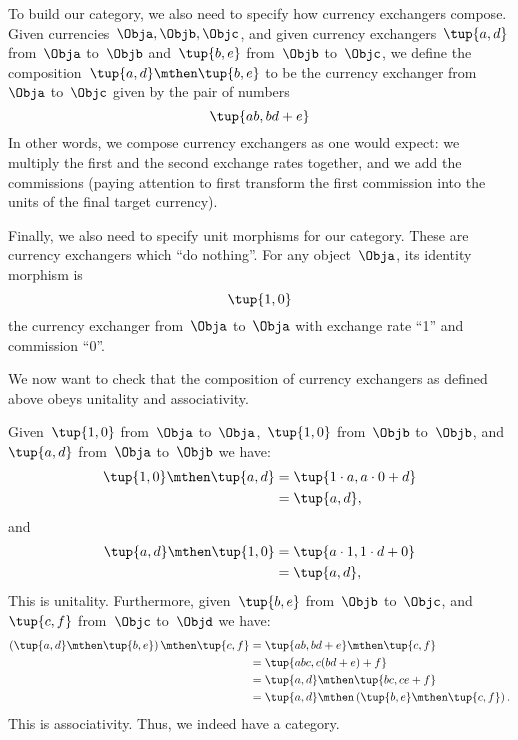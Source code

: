 To build our category, we also need to specify how currency exchangers compose.
Given currencies~$\Obja, \Objb, \Objc$, and given currency exchangers~$\tup{a,d}$ from~$\Obja$ to~$\Objb$ and~$\tup{b,e}$ from~$\Objb$ to~$\Objc$,
we define the composition~$\tup{a,d} \mthen \tup{b,e}$ to be the currency exchanger from~$\Obja$ to~$\Objc$ given by the pair of numbers
\begin{equation}
    \label{eq:comp-law-curr}
    \tup{ab,bd+e}
\end{equation}
In other words, we compose currency exchangers as one would expect: we multiply the first and the second exchange rates together, and we add the commissions (paying attention to first transform the first commission into the units of the final target currency).

Finally, we also need to specify unit morphisms for our category.
These are currency exchangers which ``do nothing''.
For any object~$\Obja$, its identity morphism is
\begin{equation*}
    \tup{1,0}
\end{equation*}
the currency exchanger from~$\Obja$ to~$\Obja$ with exchange rate ``1'' and commission ``0''.

We now want to check that the composition of currency exchangers as defined above obeys unitality and associativity.

Given~$\tup{1,0}$ from~$\Obja$ to~$\Obja$,~$\tup{1,0}$ from~$\Objb$ to~$\Objb$, and~$\tup{a,d}$ from~$\Obja$ to~$\Objb$ we have:
\begin{equation*}
    \begin{aligned}
        \tup{1,0}\mthen\tup{a,d} & =\tup{1\cdot a, a\cdot 0+d} \\
        & =\tup{a,d},
    \end{aligned}
\end{equation*}
and
\begin{equation*}
    \begin{aligned}
        \tup{a,d}\mthen \tup{1,0} & =\tup{a\cdot 1, 1\cdot d+0} \\
        & =\tup{a,d},
    \end{aligned}
\end{equation*}
This is unitality.
Furthermore, given~$\tup{b,e}$ from~$\Objb$ to~$\Objc$, and~$\tup{c,f}$ from~$\Objc$ to~$\Objd$ we have:
\begin{equation*}
    \begin{aligned}
        \left( \tup{a,d}\mthen \tup{b,e}\right)\mthen \tup{c,f} & =\tup{ab,bd+e}\mthen \tup{c,f} \\
        & =\tup{abc,c(bd+e)+f} \\
        & =\tup{a,d}\mthen \tup{bc,ce+f} \\
        & =\tup{a,d}\mthen \left( \tup{b,e}\mthen \tup{c,f}\right).
    \end{aligned}
\end{equation*}
This is associativity.
Thus, we indeed have a category.

